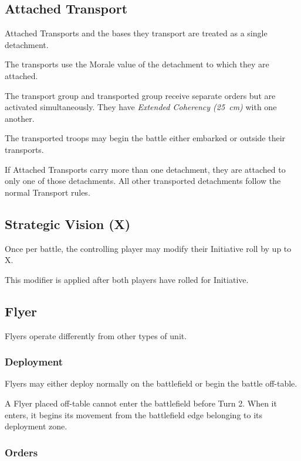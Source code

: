 \subsection{Attached Transport}

Attached Transports and the bases they transport are treated as a single detachment.

The transports use the Morale value of the detachment to which they are attached.

The transport group and transported group receive separate orders but are activated simultaneously. They have \textit{Extended Coherency (25~cm)} with one another.

The transported troops may begin the battle either embarked or outside their transports.

If Attached Transports carry more than one detachment, they are attached to only one of those detachments. All other transported detachments follow the normal Transport rules.

\subsection{Strategic Vision (X)}

Once per battle, the controlling player may modify their Initiative roll by up to X.

This modifier is applied after both players have rolled for Initiative.

\subsection{Flyer}

Flyers operate differently from other types of unit.

\subsubsection{Deployment}

Flyers may either deploy normally on the battlefield or begin the battle off-table.

A Flyer placed off-table cannot enter the battlefield before Turn 2. When it enters, it begins its movement from the battlefield edge belonging to its deployment zone.

\subsubsection{Orders}


